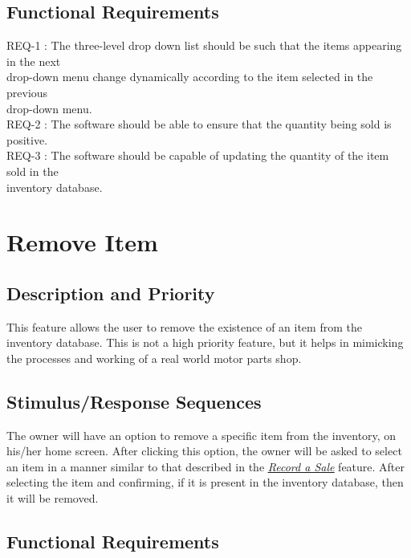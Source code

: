 \documentclass{scrreprt}
\begin{document}
\subsection{Functional Requirements}

REQ-1 : The three-level drop down list should be such that the items appearing in the next\\ \hspace*{1.5cm} drop-down menu change dynamically according to the item selected in the previous\\\hspace*{1.5cm} drop-down menu.\\
REQ-2 : The software should be able to ensure that the quantity being sold is positive.\\
REQ-3 : The software should be capable of updating the quantity of the item sold in the\\ \hspace*{1.5cm} inventory database.

\section{Remove Item}

\subsection{Description and Priority}

This feature allows the user to remove the existence of an item from the inventory database. This is not a high priority feature, but it helps in mimicking the processes and working of a real world motor parts shop.

\subsection{Stimulus/Response Sequences}

The owner will have an option to remove a specific item from the inventory, on his/her home screen. After clicking this option, the owner will be asked to select an item in a manner similar to that described in the \hyperref[sec:4.3]{\underline{\textit{Record a Sale}}} feature. After selecting the item and confirming, if it is present in the inventory database, then it will be removed.

\subsection{Functional Requirements}
\end{document}
